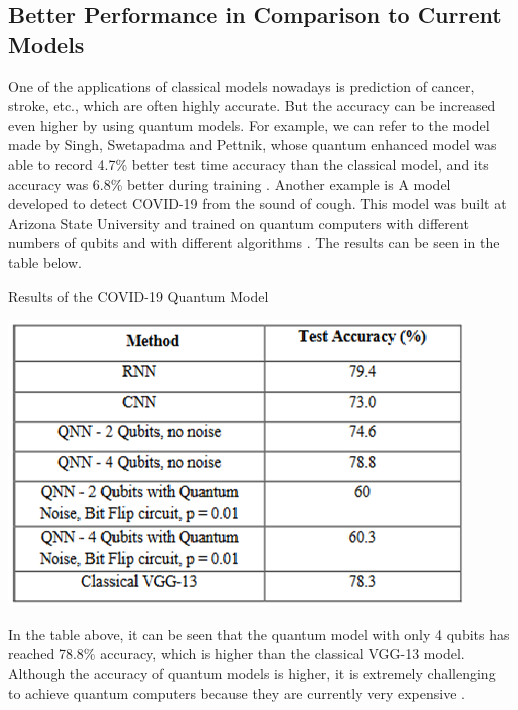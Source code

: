 \documentclass[conference]{IEEEtran}
\begin{document}
\subsection{Better Performance in Comparison to Current Models}
One of the applications of classical models nowadays is prediction of cancer, stroke, etc., which are often highly accurate. But the accuracy can be increased even higher by using quantum models. For example, we can refer to the model made by Singh, Swetapadma and Pettnik, whose quantum enhanced model was able to record 4.7\% better test time accuracy than the classical model, and its accuracy was 6.8\% better during training \cite{b1}. Another example is A model developed to detect COVID-19 from the sound of cough. This model was built at Arizona State University and trained on quantum computers with different numbers of qubits and with different algorithms \cite{b25}. The results can be seen in the table below.

\begin{table}[htbp]
	\caption{Results of the COVID-19 Quantum Model \cite{b25}}
	\centerline{\includegraphics[scale=0.85]{covid.png}}
	\label{table3}
\end{table}

In the table above, it can be seen that the quantum model with only 4 qubits has reached 78.8\% accuracy, which is higher than the classical VGG-13 model. Although the accuracy of quantum models is higher, it is extremely challenging to achieve quantum computers because they are currently very expensive \cite{b25}.
\end{document}
